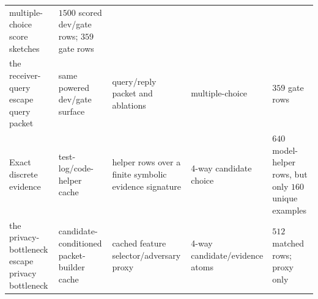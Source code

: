 \documentclass{article}
\begin{document}
\begin{longtable}[]{@{}lllll@{}}
\begin{minipage}[t]{0.17\columnwidth}
multiple-choice score sketches\strut
\end{minipage} & \begin{minipage}[t]{0.17\columnwidth}\raggedright
\(1500\) scored dev/gate rows; \(359\) gate rows\strut
\end{minipage}\tabularnewline
\begin{minipage}[t]{0.17\columnwidth}\raggedright
the receiver-query escape query packet\strut
\end{minipage} & \begin{minipage}[t]{0.17\columnwidth}\raggedright
same powered dev/gate surface\strut
\end{minipage} & \begin{minipage}[t]{0.17\columnwidth}\raggedright
query/reply packet and ablations\strut
\end{minipage} & \begin{minipage}[t]{0.17\columnwidth}\raggedright
multiple-choice\strut
\end{minipage} & \begin{minipage}[t]{0.17\columnwidth}\raggedright
\(359\) gate rows\strut
\end{minipage}\tabularnewline
\begin{minipage}[t]{0.17\columnwidth}\raggedright
Exact discrete evidence\strut
\end{minipage} & \begin{minipage}[t]{0.17\columnwidth}\raggedright
test-log/code-helper cache\strut
\end{minipage} & \begin{minipage}[t]{0.17\columnwidth}\raggedright
helper rows over a finite symbolic evidence signature\strut
\end{minipage} & \begin{minipage}[t]{0.17\columnwidth}\raggedright
4-way candidate choice\strut
\end{minipage} & \begin{minipage}[t]{0.17\columnwidth}\raggedright
\(640\) model-helper rows, but only \(160\) unique
examples\strut
\end{minipage}\tabularnewline
\begin{minipage}[t]{0.17\columnwidth}\raggedright
the privacy-bottleneck escape privacy bottleneck\strut
\end{minipage} & \begin{minipage}[t]{0.17\columnwidth}\raggedright
candidate-conditioned packet-builder cache\strut
\end{minipage} & \begin{minipage}[t]{0.17\columnwidth}\raggedright
cached feature selector/adversary proxy\strut
\end{minipage} & \begin{minipage}[t]{0.17\columnwidth}\raggedright
4-way candidate/evidence atoms\strut
\end{minipage} & \begin{minipage}[t]{0.17\columnwidth}\raggedright
\(512\) matched rows; proxy only\strut
\end{minipage}\tabularnewline
\bottomrule
\end{longtable}
\endgroup
\end{document}

